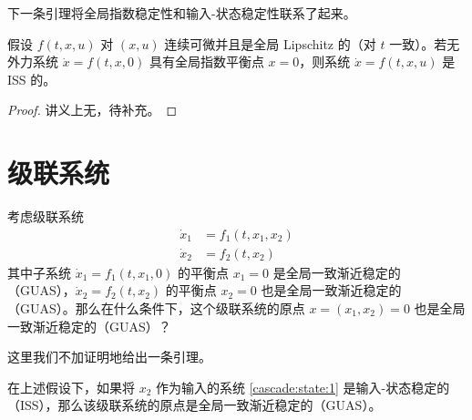 下一条引理将全局指数稳定性和输入-状态稳定性联系了起来。

\begin{lemma}\label{ISS_lemma}
    假设 $f(t, x, u)$ 对 $(x, u)$ 连续可微并且是全局 Lipschitz 的（对 $t$ 一致）。若无外力系统 $\dot{x} = f (t, x, 0)$ 具有全局指数平衡点 $x = 0$，则系统 $\dot{x} = f (t, x, u)$ 是 ISS 的。
\end{lemma}

\begin{proof}
    讲义上无，待补充。%
\end{proof}


\section*{级联系统}

考虑级联系统
\begin{align*}
    \dot{x}_1 & = f_1 (t, x_1, x_2)  \label{cascade:state:1}\\
    \dot{x}_2 & = f_2 (t, x_2)  \label{cascade:state:2}
\end{align*}
其中子系统 $\dot{x}_1 = f_1 (t, x_1, 0)$ 的平衡点 $x_1 = 0$ 是全局一致渐近稳定的（GUAS），$\dot{x}_2 = f_2(t, x_2)$ 的平衡点 $x_2 = 0$ 也是全局一致渐近稳定的（GUAS）。那么在什么条件下，这个级联系统的原点 $x = (x_1, x_2) = 0$ 也是全局一致渐近稳定的（GUAS）？

这里我们不加证明地给出一条引理。
\begin{lemma}
    在上述假设下，如果将 $x_2$ 作为输入的系统 \eqref{cascade:state:1} 是输入-状态稳定的（ISS），那么该级联系统的原点是全局一致渐近稳定的（GUAS）。
\end{lemma}
